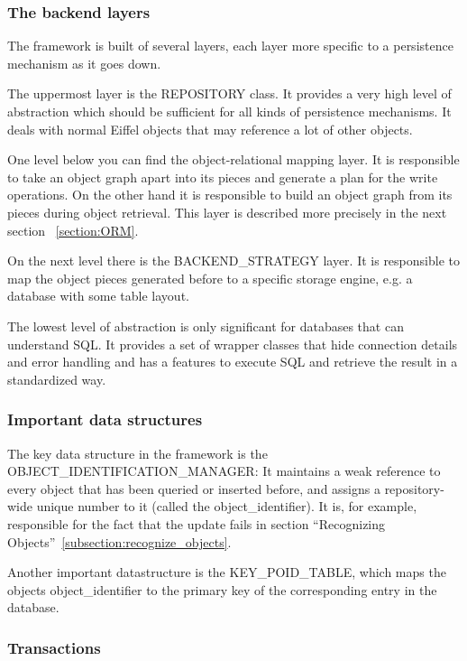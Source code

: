 \subsubsection{The backend layers}

The framework is built of several layers, each layer more specific to a persistence mechanism as it goes down.

The uppermost layer is the REPOSITORY class. 
It provides a very high level of abstraction which should be sufficient for all kinds of persistence mechanisms.
It deals with normal Eiffel objects that may reference a lot of other objects.

One level below you can find the object-relational mapping layer.
It is responsible to take an object graph apart into its pieces and generate a plan for the write operations.
On the other hand it is responsible to build an object graph from its pieces during object retrieval.
This layer is described more precisely in the next section ~\ref{section:ORM}.

On the next level there is the BACKEND\_STRATEGY layer.
It is responsible to map the object pieces generated before to a specific storage engine, e.g. a database with some table layout.

The lowest level of abstraction is only significant for databases that can understand SQL. 
It provides a set of wrapper classes that hide connection details and error handling and has a features to execute SQL and retrieve the result in a standardized way.

\subsubsection{Important data structures}

The key data structure in the framework is the OBJECT\_\-IDENTIFICATION\_MANAGER: 
It maintains a weak reference to every object that has been queried or inserted before, and assigns a repository-wide unique number to it (called the object\_identifier).
It is, for example, responsible for the fact that the update fails in section ``Recognizing Objects''~\ref{subsection:recognize_objects}.

Another important datastructure is the KEY\_POID\_TABLE, which maps the objects object\_identifier to the primary key of the corresponding entry in the database.

\subsubsection{Transactions}

